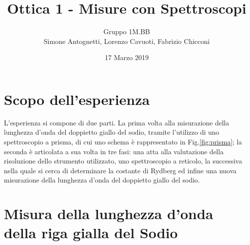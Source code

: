 \documentclass[10pt,a4paper]{article}
\author{Gruppo 1M.BB \\Simone Antognetti, Lorenzo Cavuoti, Fabrizio Chicconi}
\title{Ottica 1 - Misure con Spettroscopi}
\begin{document}
\date{17 Marzo 2019}
\maketitle


\section*{Scopo dell'esperienza}
L'esperienza si compone di due parti. La prima volta alla misurazione della lunghezza d'onda del doppietto giallo del sodio, tramite l'utilizzo di uno spettroscopio a prisma, di cui uno schema è rappresentato in Fig.\ref{fig:prisma}; la seconda è articolata a sua volta in tre fasi: una atta alla valutazione della risoluzione dello strumento utilizzato, uno spettroscopio a reticolo, la successiva nella quale si cerca di determinare la costante di Rydberg ed infine una nuova misurazione della lunghezza d'onda del doppietto giallo del sodio.

\section*{Misura della lunghezza d’onda della riga gialla del Sodio}
\end{document}
